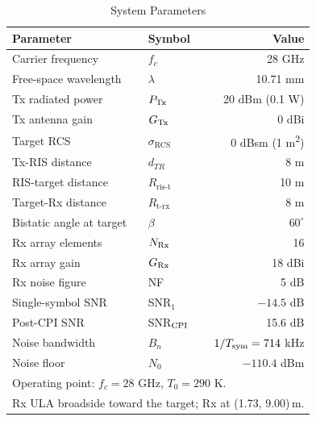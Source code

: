 \documentclass[journal]{IEEEtran}
\begin{document}
\begin{table}[!t]
\renewcommand{\arraystretch}{1.15}
\caption{System Parameters}
\label{tab:sys_params}
\centering
\begin{tabular}{l l r}
\hline\hline
Parameter & Symbol & Value \\
\hline
Carrier frequency & $f_c$ & 28 GHz \\
Free-space wavelength & $\lambda$ & 10.71 mm \\
Tx radiated power & $P_{\rm Tx}$ & 20 dBm (0.1 W) \\
Tx antenna gain & $G_{\rm Tx}$ & 0 dBi \\
Target RCS & $\sigma_{\mathrm{RCS}}$ & 0 dBsm (1 m\textsuperscript{2}) \\
Tx-RIS distance & $d_{TR}$ & 8 m \\
RIS-target distance & $R_{\mathrm{ris\text{-}t}}$ & 10 m \\
Target-Rx distance & $R_{\mathrm{t\text{-}rx}}$ & 8 m \\
Bistatic angle at target & $\beta$ & $60^\circ$ \\ 
Rx array elements & $N_{\rm Rx}$ & 16 \\
Rx array gain & $G_{\rm Rx}$ & 18 dBi \\
Rx noise figure & NF & 5 dB \\
Single-symbol SNR & SNR$_1$ & $-14.5$ dB \\
Post-CPI SNR & SNR$_{\rm CPI}$ & 15.6 dB \\
Noise bandwidth & $B_n$ & $1/T_{\rm sym}=714$ kHz \\
Noise floor & $N_0$ & $-110.4$ dBm \\
\hline\hline
\multicolumn{3}{l}{\footnotesize Operating point: $f_c=28$ GHz, $T_0=290$ K.} \\
\multicolumn{3}{l}{\footnotesize Rx ULA broadside toward the target; Rx at (1.73, 9.00)\,m.} \\ 
\hline
\end{tabular}
\end{table}
\end{document}
